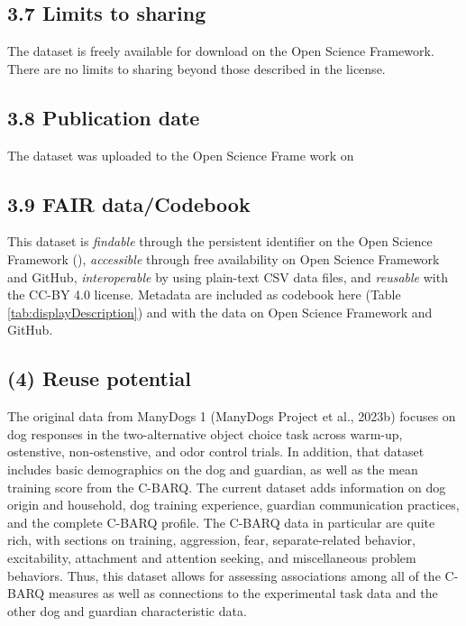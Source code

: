 \documentclass[
  pub,floatsintext]{apa6}
\begin{document}
\hypertarget{limits-to-sharing}{%
\subsection{3.7 Limits to sharing}\label{limits-to-sharing}}

The dataset is freely available for download on the Open Science Framework. There are no limits to sharing beyond those described in the license.

\hypertarget{publication-date}{%
\subsection{3.8 Publication date}\label{publication-date}}

The dataset was uploaded to the Open Science Frame work on

\hypertarget{fair-datacodebook}{%
\subsection{3.9 FAIR data/Codebook}\label{fair-datacodebook}}

This dataset is \emph{findable} through the persistent identifier on the Open Science Framework (), \emph{accessible} through free availability on Open Science Framework and GitHub, \emph{interoperable} by using plain-text CSV data files, and \emph{reusable} with the CC-BY 4.0 license. Metadata are included as codebook here (Table \ref{tab:displayDescription}) and with the data on Open Science Framework and GitHub.

\hypertarget{reuse-potential}{%
\subsection{(4) Reuse potential}\label{reuse-potential}}

The original data from ManyDogs 1 (ManyDogs Project et al., 2023b) focuses on dog responses in the two-alternative object choice task across warm-up, ostenstive, non-ostenstive, and odor control trials. In addition, that dataset includes basic demographics on the dog and guardian, as well as the mean training score from the C-BARQ. The current dataset adds information on dog origin and household, dog training experience, guardian communication practices, and the complete C-BARQ profile. The C-BARQ data in particular are quite rich, with sections on training, aggression, fear, separate-related behavior, excitability, attachment and attention seeking, and miscellaneous problem behaviors. Thus, this dataset allows for assessing associations among all of the C-BARQ measures as well as connections to the experimental task data and the other dog and guardian characteristic data.
\end{document}
